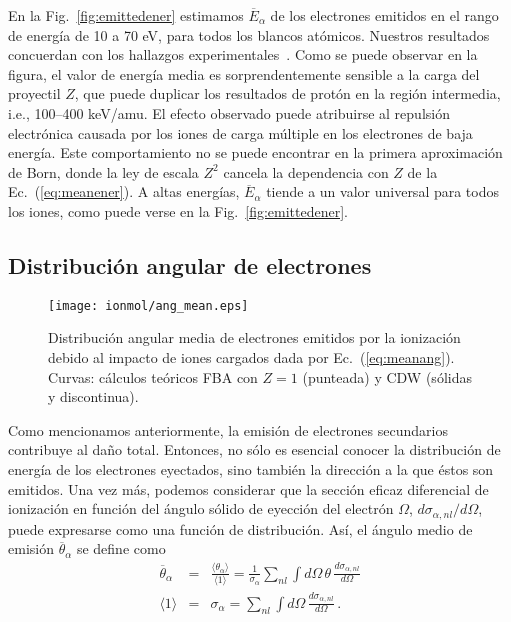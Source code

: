 En la Fig.~\ref{fig:emittedener} estimamos $\overline{E}_{\alpha}$ de los 
electrones emitidos en el rango de energía de 10 a 70 eV, para todos los 
blancos atómicos. Nuestros resultados concuerdan con los hallazgos 
experimentales~\cite{Surdutovic:18}. Como se puede observar en la 
figura, el valor de energía media es sorprendentemente sensible a la 
carga del proyectil $Z$, que puede duplicar los resultados de protón en 
la región intermedia, i.e., 100--400 keV/amu. El efecto observado puede 
atribuirse al repulsión electrónica causada por los iones de carga 
múltiple en los electrones de baja energía. Este comportamiento no se 
puede encontrar en la primera aproximación de Born, donde la ley de 
escala $Z^2$ cancela la dependencia con $Z$ de la Ec.~(\ref{eq:meanener}).
A altas energías, $\overline{E}_{\alpha}$ tiende a un valor universal 
para todos los iones, como puede verse en la Fig.~\ref{fig:emittedener}.

\subsection{Distribución angular de electrones}
\label{subsec:meanang}

\begin{figure}
\centering
\texttt{[image: ionmol/ang\_mean.eps]}
\caption[Distribución angular media de electrones emitidos.]
{Distribución angular media de electrones emitidos por la ionización 
debido al impacto de iones cargados dada por Ec.~(\ref{eq:meanang}). 
Curvas: cálculos teóricos FBA con $Z=1$ (punteada) y CDW (sólidas y 
discontinua).}
\label{fig:emittedang}
\end{figure} 

Como mencionamos anteriormente, la emisión de electrones secundarios 
contribuye al daño total. Entonces, no sólo es esencial conocer la 
distribución de energía de los electrones eyectados, sino también la 
dirección a la que éstos son emitidos. Una vez más, podemos considerar 
que la sección eficaz diferencial de ionización en función del ángulo 
sólido de eyección del electrón $\Omega$, $d\sigma_{\alpha,nl}/d\Omega$, 
puede expresarse como una función de distribución. Así, el ángulo medio 
de emisión $\overline{\theta}_{\alpha}$ se define como
\begin{eqnarray}
\overline{\theta}_{\alpha}&=&\frac{\langle\theta_{\alpha}\rangle}
{\langle 1\rangle}=\frac{1}{\sigma_{\alpha}}\sum\limits_{nl}
\int d\Omega\,\theta\,\frac{d\sigma_{\alpha,nl}}{d\Omega} 
\label{eq:meanang} \\
\langle 1\rangle &=&\sigma_{\alpha}=\sum\limits_{nl}\int d\Omega\,
\frac{d\sigma_{\alpha,nl}}{d\Omega}\,.
\end{eqnarray}

